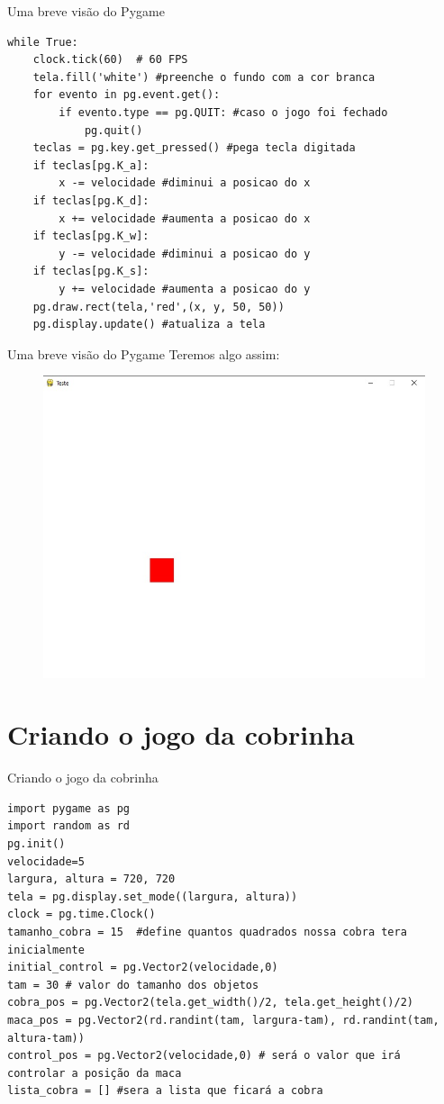 \documentclass[fleqn,utf8,aspectratio=169,14pt]{beamer}
\begin{document}
	\begin{frame}[fragile]{Uma breve visão do Pygame}
		\begin{lstlisting}
while True:
	clock.tick(60)  # 60 FPS
	tela.fill('white') #preenche o fundo com a cor branca
	for evento in pg.event.get():
		if evento.type == pg.QUIT: #caso o jogo foi fechado
			pg.quit()
	teclas = pg.key.get_pressed() #pega tecla digitada
	if teclas[pg.K_a]:
		x -= velocidade #diminui a posicao do x
	if teclas[pg.K_d]:
		x += velocidade #aumenta a posicao do x
	if teclas[pg.K_w]:
		y -= velocidade #diminui a posicao do y
	if teclas[pg.K_s]:
		y += velocidade #aumenta a posicao do y
	pg.draw.rect(tela,'red',(x, y, 50, 50))
	pg.display.update() #atualiza a tela	
		\end{lstlisting}
	\end{frame}
	
	\begin{frame}{Uma breve visão do Pygame}
		Teremos algo assim:
		
		\begin{figure}
			\centering
			\includegraphics[width=0.7\linewidth]{Imagem8}
			\caption{}
			\label{fig:imagem8}
		\end{figure}
		
	\end{frame}
	
	\section{Criando o jogo da cobrinha}
	\begin{frame}[fragile]{Criando o jogo da cobrinha}
		
		\begin{lstlisting}
import pygame as pg
import random as rd
pg.init()
velocidade=5
largura, altura = 720, 720
tela = pg.display.set_mode((largura, altura))
clock = pg.time.Clock()
tamanho_cobra = 15  #define quantos quadrados nossa cobra tera inicialmente
initial_control = pg.Vector2(velocidade,0)
tam = 30 # valor do tamanho dos objetos
cobra_pos = pg.Vector2(tela.get_width()/2, tela.get_height()/2)
maca_pos = pg.Vector2(rd.randint(tam, largura-tam), rd.randint(tam, altura-tam))
control_pos = pg.Vector2(velocidade,0) # será o valor que irá controlar a posição da maca
lista_cobra = [] #sera a lista que ficará a cobra
		\end{lstlisting}
		
	\end{frame}
	
\end{document}
